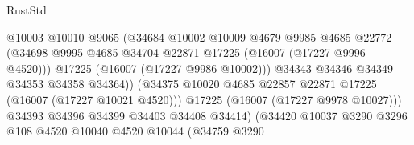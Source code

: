 \begin{lexlean}{RustStd}
\begin{coremodule}
                                            @10003
                                            @10010
                                            @9065
                                            (@34684
                                              @10002
                                              @10009
                                              @4679
                                              @9985
                                              @4685
                                              @22772
                                              (@34698
                                                @9995
                                                @4685
                                                @34704
                                                @22871
                                                @17225
                                                (@16007 (@17227 @9996 @4520)))
                                              @17225
                                              (@16007 (@17227 @9986 @10002)))
                                            @34343
                                            @34346
                                            @34349
                                            @34353
                                            @34358
                                            @34364))
                                        (@34375
                                          @10020
                                          @4685
                                          @22857
                                          @22871
                                          @17225
                                          (@16007 (@17227 @10021 @4520)))
                                        @17225
                                        (@16007 (@17227 @9978 @10027)))
                                      @34393
                                      @34396
                                      @34399
                                      @34403
                                      @34408
                                      @34414)
                                    (@34420
                                      @10037
                                      @3290
                                      @3296
                                      @108
                                      @4520
                                      @10040
                                      @4520
                                      @10044
                                      (@34759
                                        @3290

\end{coremodule}
\end{lexlean}
